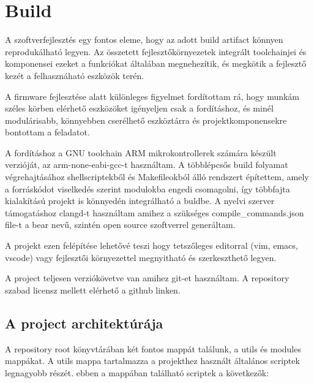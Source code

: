 
\section{Build}

A szoftverfejlesztés egy fontos eleme, hogy az adott build artifact könnyen
reprodukálható legyen. Az összetett fejlesztőkörnyezetek integrált toolchainjei
és komponensei ezeket a funkciókat általában megnehezítik, és megkötik a
fejlesztő kezét a felhasznáható eszközök terén.

A firmware fejlesztése alatt különleges figyelmet fordítottam rá, hogy munkám
széles körben elérhető eszközöket igényeljen csak a fordításhoz, és minél
modulárisabb, könnyebben cserélhető eszköztárra és projektkomponensekre bontottam
a feladatot.

A fordításhoz a GNU toolchain ARM mikrokontrollerek számára készült verzióját, az
arm-none-eabi-gcc-t használtam. A többlépcsős build folyamat végrehajtásához
shellscriptekből és Makefileokból álló rendszert építettem, amely a forráskódot
viselkedés szerint modulokba engedi csomagolni, így többfajta kialakítású projekt
is könnyedén integrálható a buldbe. A nyelvi szerver támogatáshoz clangd-t
használtam amihez a szükséges compile\_commands.json file-t a bear nevű, szintén
open source szoftverrel generáltam.

A projekt ezen felépítése lehetővé teszi hogy tetszőleges editorral (vim, emacs,
vscode) vagy fejlesztői környezettel megnyitható és szerkeszthető legyen.

A project teljesen verziókövetve van amihez git-et használtam. A repository
szabad licensz mellett elérhető a github linken. 

\subsection{A project architektúrája}

A repository root könyvtárában két fontos mappát találunk, a utils és modules
mappákat. A utils mappa tartalmazza a projekthez használt általános scriptek
legnagyobb részét. ebben a mappában található scriptek a következők:

